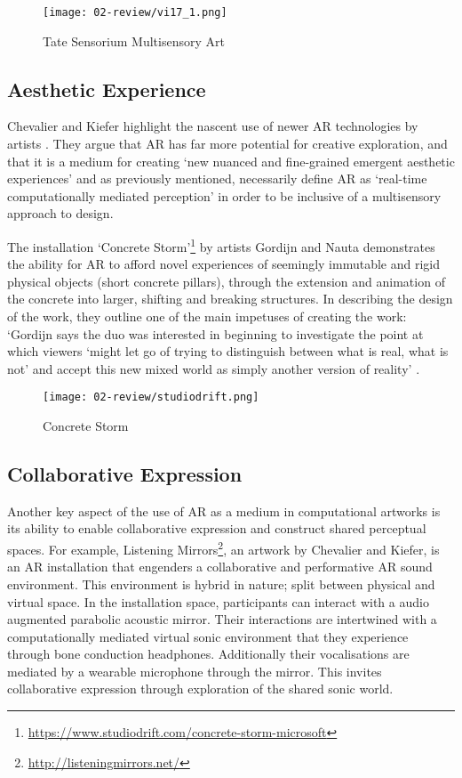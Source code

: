 \begin{figure}[bth]
    \myfloatalign
    {\texttt{[image: 02-review/vi17\_1.png]}}
    \caption[Tate Sensorium Multisensory Art]{Tate Sensorium Multisensory Art}\label{fig: tate}
\end{figure}

\subsection{Aesthetic Experience}\label{sec: ar-arts-aesthetics}
Chevalier and Kiefer highlight the nascent use of newer AR technologies by artists \citeyearpar{chevalier2020}. They argue that AR has far more potential for creative exploration, and that it is a medium for creating `new nuanced and fine-grained emergent aesthetic experiences' and as previously mentioned, necessarily define AR as `real-time computationally mediated perception' in order to be inclusive of a multisensory approach to design. 

The installation `Concrete Storm'\footnote{\url{https://www.studiodrift.com/concrete-storm-microsoft}} by artists Gordijn and Nauta demonstrates the ability for AR to afford novel experiences of seemingly immutable and rigid physical objects (short concrete pillars), through the extension and animation of the concrete into larger, shifting and breaking structures. In describing the design of the work, they outline one of the main impetuses of creating the work: `Gordijn says the duo was interested in beginning to investigate the point at which viewers `might let go of trying to distinguish between what is real, what is not' and accept this new mixed world as simply another version of reality' \citep{gottschalk2017}. 

\begin{figure}[bth]
    \myfloatalign
    {\texttt{[image: 02-review/studiodrift.png]}}
    \caption[Concrete Storm]{Concrete Storm}
\end{figure}\label{fig: concretestorm}

\subsection{Collaborative Expression}\label{sec: ar-arts-collaboration}
Another key aspect of the use of AR as a medium in computational artworks is its ability to enable collaborative expression and construct shared perceptual spaces. For example, Listening Mirrors\footnote{\url{http://listeningmirrors.net/}}, an artwork by Chevalier and Kiefer, \citeyearpar{chevalier2018} is an AR installation that engenders a collaborative and performative AR sound environment. This environment is hybrid in nature; split between physical and virtual space. In the installation space, participants can interact with a audio augmented parabolic acoustic mirror. Their interactions are intertwined with a computationally mediated virtual sonic environment that they experience through bone conduction headphones. Additionally their vocalisations are mediated by a wearable microphone through the mirror. This invites collaborative expression through exploration of the shared sonic world.

